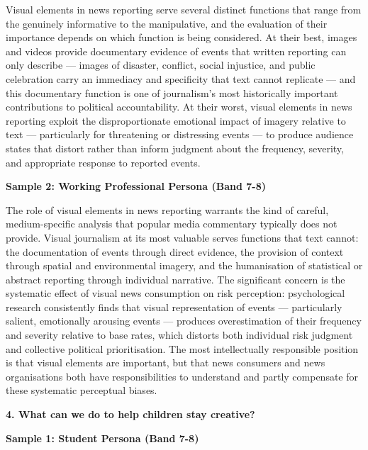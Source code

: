 Visual elements in news reporting serve several distinct functions that range from the genuinely informative to the manipulative, and the evaluation of their importance depends on which function is being considered. At their best, images and videos provide documentary evidence of events that written reporting can only describe — images of disaster, conflict, social injustice, and public celebration carry an immediacy and specificity that text cannot replicate — and this documentary function is one of journalism's most historically important contributions to political accountability. At their worst, visual elements in news reporting exploit the disproportionate emotional impact of imagery relative to text — particularly for threatening or distressing events — to produce audience states that distort rather than inform judgment about the frequency, severity, and appropriate response to reported events.

\textbf{Sample 2: Working Professional Persona (Band 7-8)}

The role of visual elements in news reporting warrants the kind of careful, medium-specific analysis that popular media commentary typically does not provide. Visual journalism at its most valuable serves functions that text cannot: the documentation of events through direct evidence, the provision of context through spatial and environmental imagery, and the humanisation of statistical or abstract reporting through individual narrative. The significant concern is the systematic effect of visual news consumption on risk perception: psychological research consistently finds that visual representation of events — particularly salient, emotionally arousing events — produces overestimation of their frequency and severity relative to base rates, which distorts both individual risk judgment and collective political prioritisation. The most intellectually responsible position is that visual elements are important, but that news consumers and news organisations both have responsibilities to understand and partly compensate for these systematic perceptual biases.

\separator

\begin{ieltsquestion}
\textbf{4. What can we do to help children stay creative?}
\end{ieltsquestion}
\textbf{Sample 1: Student Persona (Band 7-8)}

